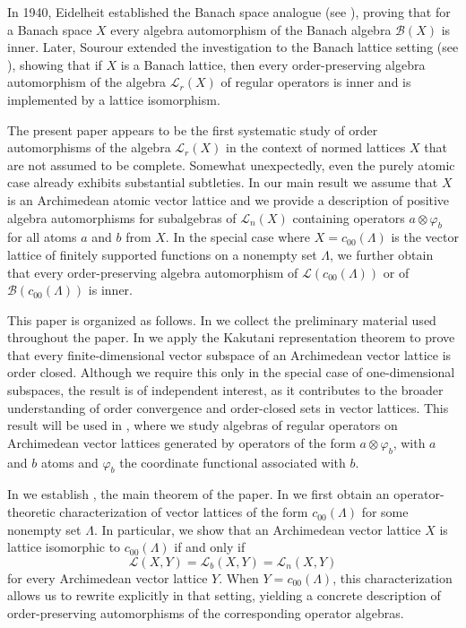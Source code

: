 \documentclass[12pt,reqno]{amsart}
\theoremstyle{plain}
\theoremstyle{definition}
\begin{document}
In 1940, Eidelheit established the Banach space analogue (see \cite{Eid40}), proving that for a Banach space $X$ every algebra automorphism of the Banach algebra $\mathscr{B}(X)$ is inner. Later, Sourour extended the investigation to the Banach lattice setting (see \cite[Theorem~2]{Sou86}), showing that if $X$ is a Banach lattice, then every order-preserving algebra automorphism of the algebra $\mathscr{L}_r(X)$ of regular operators is inner and is implemented by a lattice isomorphism.

The present paper appears to be the first systematic study of order automorphisms of the algebra $\mathscr{L}_r(X)$ in the context of normed lattices $X$ that are not assumed to be complete. Somewhat unexpectedly, even the purely atomic case already exhibits substantial subtleties. 
In our main result  we assume that $X$ is an Archimedean atomic vector lattice and we provide a description of positive algebra automorphisms for subalgebras of $\mathscr L_n(X)$ containing operators $a\otimes \varphi_b$ for all atoms $a$ and $b$ from $X$.
In the special case where $X=c_{00}(\Lambda)$ is the vector lattice of finitely supported functions on a nonempty set $\Lambda$, we further obtain that every order-preserving algebra automorphism of $\mathscr{L}(c_{00}(\Lambda))$ or of $\mathscr{B}(c_{00}(\Lambda))$ is inner.

This paper is organized as follows. In  we collect the preliminary material used throughout the paper. In  we apply the Kakutani representation theorem to prove that every finite-dimensional vector subspace of an Archimedean vector lattice is order closed. Although we require this only in the special case of one-dimensional subspaces, the result is of independent interest, as it contributes to the broader understanding of order convergence and order-closed sets in vector lattices. This result will be used in , where we study algebras of regular operators on Archimedean vector lattices generated by operators of the form $a\otimes \varphi_b$, with $a$ and $b$ atoms and $\varphi_b$ the coordinate functional associated with $b$.

In  we establish , the main theorem of the paper. In  we first obtain an operator-theoretic characterization of vector lattices of the form $c_{00}(\Lambda)$ for some nonempty set $\Lambda$. In particular, we show that an Archimedean vector lattice $X$ is lattice isomorphic to $c_{00}(\Lambda)$ if and only if
$$
\mathscr{L}(X,Y)=\mathscr{L}_b(X,Y)=\mathscr{L}_n(X,Y)
$$
for every Archimedean vector lattice $Y$. When $Y=c_{00}(\Lambda)$, this characterization allows us to rewrite  explicitly in that setting, yielding a concrete description of order-preserving automorphisms of the corresponding operator algebras.
\end{document}
